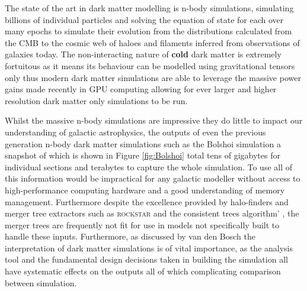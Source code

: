 The state of the art in dark matter modelling is n-body simulations, simulating billions of individual particles and solving the equation of state for each over many epochs to simulate their evolution from the distributions calculated from the CMB to the cosmic web of haloes and filaments inferred from observations of galaxies today. The non-interacting nature of \textbf{cold} dark matter is extremely fortuitous as it means its behaviour can be modelled using gravitational tensors only thus modern dark matter simulations are able to leverage the massive power gains made recently in GPU computing allowing for ever larger and higher resolution dark matter only simulations to be run. 

Whilst the massive n-body simulations are impressive they do little to impact our understanding of galactic astrophysics, the outputs of even the previous generation n-body dark matter simulations such as the Bolshoi simulation a snapshot of which is shown in Figure \ref{fig:Bolshoi} total tens of gigabytes for individual sections and terabytes to capture the whole simulation. To use all of this information would be impractical for any galactic modeller without access to high-performance computing hardware and a good understanding of memory management. Furthermore despite the excellence provided by halo-finders and merger tree extractors such as \textsc{rockstar} \cite{Behroozi2013THECORES} and the consistent trees algorithm' \cite{Behroozi2013GRAVITATIONALLYCOSMOLOGY}, the merger trees are frequently not fit for use in models not specifically built to handle these inputs. Furthermore, as discussed by van den Bosch \cite{vandenBosch2014ComingWells, vandenBosch2017DissectingSimulation, vandenBosch2018DisruptionFiction} the interpretation of dark matter simulations is of vital importance, as the analysis tool and the fundamental design decisions taken in building the simulation all have systematic effects on the outputs all of which complicating comparison between simulation.

